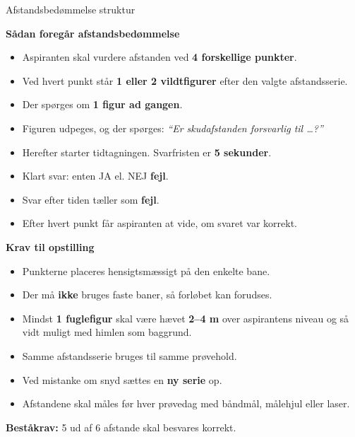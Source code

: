 \begin{frame}{Afstandsbedømmelse struktur}
  \tiny
  \setlength{\parskip}{0.35em}
  \RaggedRight

  \textbf{Sådan foregår afstandsbedømmelse}
  \begin{itemize}
    \itemsep0.15em
    \item Aspiranten skal vurdere afstanden ved \textbf{4 forskellige punkter}.
    \item Ved hvert punkt står \textbf{1 eller 2 vildtfigurer} efter den valgte afstandsserie.
    \item Der spørges om \textbf{1 figur ad gangen}.
    \item Figuren udpeges, og der spørges: \textit{``Er skudafstanden forsvarlig til \ldots?''}
    \item Herefter starter tidtagningen. Svarfristen er \textbf{5 sekunder}.
    \item Klart svar: enten JA el. NEJ \textbf{fejl}.
    \item Svar efter tiden tæller som \textbf{fejl}.
    \item Efter hvert punkt får aspiranten at vide, om svaret var korrekt.
  \end{itemize}

  \textbf{Krav til opstilling}
  \begin{itemize}
    \itemsep0.15em
    \item Punkterne placeres hensigtsmæssigt på den enkelte bane.
    \item Der må \textbf{ikke} bruges faste baner, så forløbet kan forudses.
    \item Mindst \textbf{1 fuglefigur} skal være hævet \textbf{2--4 m} over aspirantens niveau og så vidt muligt med himlen som baggrund.
    \item Samme afstandsserie bruges til samme prøvehold.
    \item Ved mistanke om snyd sættes en \textbf{ny serie} op.
    \item Afstandene skal måles før hver prøvedag med båndmål, målehjul eller laser.
  \end{itemize}

  \vspace{0.3em}
  \textbf{Beståkrav:} 5 ud af 6 afstande skal besvares korrekt.
\end{frame}

